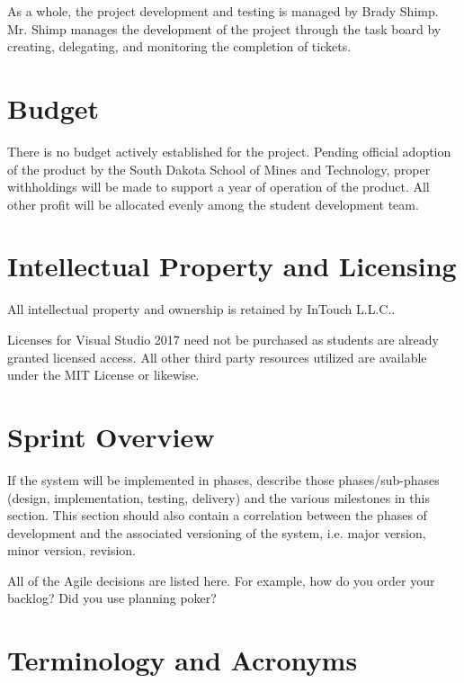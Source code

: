 As a whole, the project development and testing is managed by Brady Shimp. Mr. Shimp manages the development of the project through the task board by creating, delegating, and monitoring the completion of tickets. 

\section{Budget}

There is no budget actively established for the project. Pending official adoption of the product by the South Dakota School of Mines and Technology, proper withholdings will be made to support a year of operation of the product. All other profit will be allocated evenly among the student development team. 

\section{Intellectual Property and Licensing}

All intellectual property and ownership is retained by InTouch L.L.C.. 

Licenses for Visual Studio 2017 need not be purchased as students are already granted licensed access. All other third party resources utilized are available under the MIT License or likewise. 


\section{Sprint  Overview}
If the system will be implemented in phases, describe those phases/sub-phases (design, 
implementation, testing, delivery) and the various milestones in this section. 
 This section should also contain a correlation between the phases of development 
and the associated versioning of the system, i.e. major version, minor version, 
revision. 

All of the Agile decisions are listed here.  For example, how do you order your backlog?   
Did you use planning poker?   

\section{Terminology and Acronyms}


